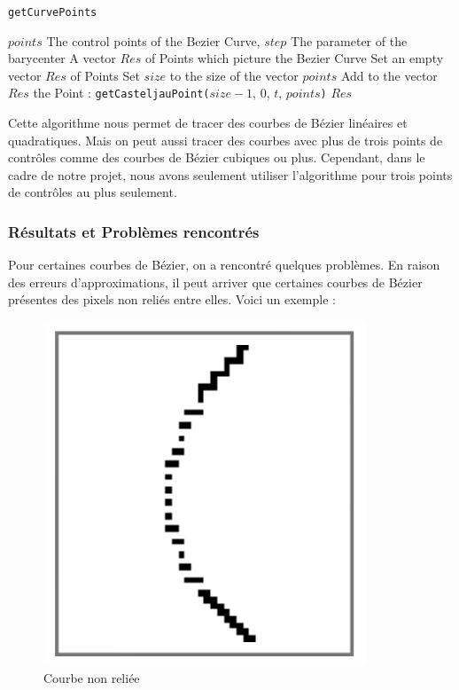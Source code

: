 \documentclass[a4paper, 12pt]{article}
\begin{document}
\begin{algorithm}
	\caption{\texttt{getCurvePoints}}
		\begin{algorithmic}[1]
		\Require $points$ The control points of the Bezier Curve, $step$ The parameter of the barycenter
		\Ensure A vector $Res$ of Points which picture the Bezier Curve
		\State Set an empty vector $Res$ of Points
		\State Set $size$ to the size of the vector $points$
			\State Add to the vector $Res$ the Point : \texttt{getCasteljauPoint(}$size-1$, $0$, $t$, $points$\texttt{)} 
		\EndFor
		\State \Return $Res$
		\EndFunction
		\end{algorithmic}
\end{algorithm}

Cette algorithme nous permet de tracer des courbes de Bézier linéaires et quadratiques. Mais on peut aussi tracer des courbes avec plus de trois points de contrôles comme des courbes de Bézier cubiques ou plus. Cependant, dans le cadre de notre projet, nous avons seulement utiliser l'algorithme pour trois points de contrôles au plus seulement.

\subsubsection{Résultats et Problèmes rencontrés}
Pour certaines courbes de Bézier, on a rencontré quelques problèmes. En raison des erreurs d'approximations, il peut arriver que certaines courbes de Bézier présentes des pixels non reliés entre elles. Voici un exemple : 

\begin{figure}[h]
\centering
\includegraphics[scale=0.3]{Images/BezierCurbe_problem.png}
\caption{Courbe non reliée}
\label{fig2}
\end{figure}
\end{document}
